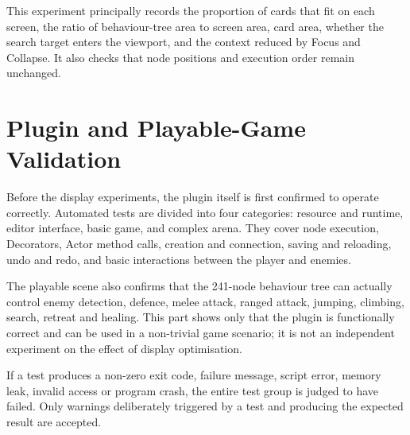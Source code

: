 This experiment principally records the proportion of cards that fit on each screen, the ratio of behaviour-tree area to screen area, card area, whether the search target enters the viewport, and the context reduced by Focus and Collapse. It also checks that node positions and execution order remain unchanged.

\section{Plugin and Playable-Game Validation}

Before the display experiments, the plugin itself is first confirmed to operate correctly. Automated tests are divided into four categories: resource and runtime, editor interface, basic game, and complex arena. They cover node execution, Decorators, Actor method calls, creation and connection, saving and reloading, undo and redo, and basic interactions between the player and enemies.

The playable scene also confirms that the 241-node behaviour tree can actually control enemy detection, defence, melee attack, ranged attack, jumping, climbing, search, retreat and healing. This part shows only that the plugin is functionally correct and can be used in a non-trivial game scenario; it is not an independent experiment on the effect of display optimisation.

If a test produces a non-zero exit code, failure message, script error, memory leak, invalid access or program crash, the entire test group is judged to have failed. Only warnings deliberately triggered by a test and producing the expected result are accepted.
